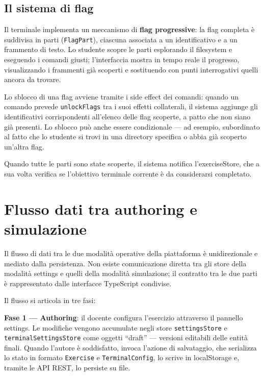 \subsection{Il sistema di flag}

Il terminale implementa un meccanismo di \textbf{flag progressive}: la flag completa è suddivisa in parti (\texttt{FlagPart}), ciascuna associata a un identificativo e a un frammento di testo. Lo studente scopre le parti esplorando il filesystem e eseguendo i comandi giusti; l'interfaccia mostra in tempo reale il progresso, visualizzando i frammenti già scoperti e sostituendo con punti interrogativi quelli ancora da trovare.

Lo sblocco di una flag avviene tramite i side effect dei comandi: quando un comando prevede \texttt{unlockFlags} tra i suoi effetti collaterali, il sistema aggiunge gli identificativi corrispondenti all'elenco delle flag scoperte, a patto che non siano già presenti. Lo sblocco può anche essere condizionale --- ad esempio, subordinato al fatto che lo studente si trovi in una directory specifica o abbia già scoperto un'altra flag.

Quando tutte le parti sono state scoperte, il sistema notifica l'exerciseStore, che a sua volta verifica se l'obiettivo terminale corrente è da considerarsi completato.


\section{Flusso dati tra authoring e simulazione}
\label{sec:flusso-dati}

Il flusso di dati tra le due modalità operative della piattaforma è unidirezionale e mediato dalla persistenza. Non esiste comunicazione diretta tra gli store della modalità settings e quelli della modalità simulazione; il contratto tra le due parti è rappresentato dalle interfacce TypeScript condivise.

Il flusso si articola in tre fasi:

\textbf{Fase 1 --- Authoring}: il docente configura l'esercizio attraverso il pannello settings. Le modifiche vengono accumulate negli store \texttt{settingsStore} e \texttt{terminalSettingsStore} come oggetti ``draft'' --- versioni editabili delle entità finali. Quando l'autore è soddisfatto, invoca l'azione di salvataggio, che serializza lo stato in formato \texttt{Exercise} e \texttt{TerminalConfig}, lo scrive in localStorage e, tramite le API REST, lo persiste su file.

